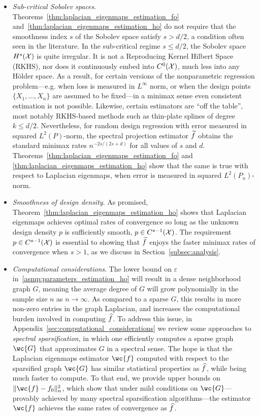 \begin{itemize}
	\item \emph{Sub-critical Sobolev spaces}. Theorems~\ref{thm:laplacian_eigenmaps_estimation_fo} and~\ref{thm:laplacian_eigenmaps_estimation_ho} do not require that the smoothness index $s$ of the Sobolev space satisfy $s > d/2$, a condition often seen in the literature. In the sub-critical regime $s \leq d/2$, the Sobolev space $H^s(\mathcal{X})$ is quite irregular. It is not a Reproducing Kernel Hilbert Space (RKHS), nor does it continuously embed into $C^0(\mathcal{X})$, much less into any H\"{o}lder space. As a result, for certain versions of the nonparametric regression problem---e.g. when loss is measured in $L^{\infty}$ norm, or when the design points $\{X_1,\ldots,X_n\}$ are assumed to be fixed---in a minimax sense even consistent estimation is not possible. Likewise, certain estimators are ``off the table'', most notably RKHS-based methods such as thin-plate splines of degree $k \leq d/2$. Nevertheless, for random design regression with error measured in squared $L^2(P)$-norm, the spectral projection estimator $\widetilde{f}$ obtains the standard minimax rates $n^{-2s/(2s + d)}$ for all values of $s$ and $d$. Theorems~\ref{thm:laplacian_eigenmaps_estimation_fo} and \ref{thm:laplacian_eigenmaps_estimation_ho} show that the same is true with respect to Laplacian eigenmaps, when error is measured in squared $L^2(P_n)$-norm.
	\item \emph{Smoothness of design density}. As promised,  Theorem~\ref{thm:laplacian_eigenmaps_estimation_ho} shows that Laplacian eigenmaps achieves optimal rates of convergence so long as the unknown design density $p$ is sufficiently smooth, $p \in C^{s - 1}(\mathcal{X})$. The requirement $p \in C^{s - 1}(\mathcal{X})$ is essential to showing that $\widehat{f}$ enjoys the faster minimax rates of convergence when $s > 1$,  as we discuss in Section~\ref{subsec:analysis}. 
	\item \emph{Computational considerations}. The lower bound on $\varepsilon$ in~\ref{asmp:parameters_estimation_ho} will result in a dense neighborhood graph $G$, meaning the average degree of $G$ will grow polynomially in the sample size $n$ as $n \to \infty$. As compared to a sparse $G$, this results in more non-zero entries in the graph Laplacian, and increases the computational burden involved in computing $\widehat{f}$. To address this issue, in Appendix~\ref{sec:computational_considerations} we review some approaches to \emph{spectral sparsification}, in which one efficiently computes a sparse graph $\wc{G}$ that approximates $G$ in a spectral sense. The hope is that the Laplacian eigenmaps estimator $\wc{f}$ computed with respect to the sparsified graph $\wc{G}$ has similar statistical properties as $\widehat{f}$, while being much faster to compute. To that end, we provide upper bounds on $\|\wc{f} - f_0\|_n^2$, which show that under mild conditions on $\wc{G}$---provably achieved by many spectral sparsification algorithms---the estimator $\wc{f}$ achieves the same rates of convergence as $\widehat{f}$. 
\end{itemize}

